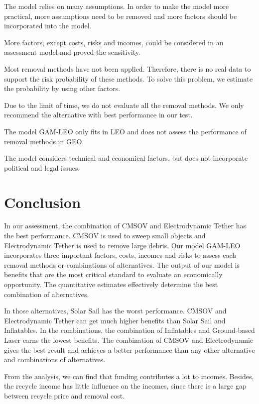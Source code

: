 \documentclass{mcmthesis}
\begin{document}
		The model relies on many assumptions. In order to make the model more practical, more assumptions need to be removed and more factors should be incorporated into the model.
		
		More factors, except costs, risks and incomes, could be considered in an assessment model and proved the sensitivity.
		
		Most removal methods have not been applied. Therefore, there is no real data to support the risk probability of these methods. To solve this problem, we estimate the probability by using other factors.
		
		Due to the limit of time, we do not evaluate all the removal methods. We only recommend the alternative with best performance in our test.
		
		The model GAM-LEO only fits in LEO and does not assess the performance of removal methods in GEO.
		
		The model considers technical and economical factors, but does not incorporate political and legal issues.


	
	
\section{Conclusion} \label{Sec-Conclusion}
	In our assessment, the combination of CMSOV and Electrodynamic Tether has the best performance. CMSOV is used to sweep small objects and Electrodynamic Tether is used to remove large debris. Our model GAM-LEO incorporates three important factors, costs, incomes and risks to assess each removal methods or combinations of alternatives. The output of our model is benefits that are the most critical standard to evaluate an economically opportunity. The quantitative estimates effectively determine the best combination of alternatives.
	
	In those alternatives, Solar Sail has the worst performance. CMSOV and Electrodynamic Tether can get much higher benefits than Solar Sail and Inflatables. In the combinations, the combination of Inflatables and Ground-based Laser earns the lowest benefits. The combination of CMSOV and Electrodynamic gives the best result and achieves a better performance than any other alternative and combinations of alternatives.
	
	From the analysis, we can find that funding contributes a lot to incomes. Besides, the recycle income has little influence on the incomes, since there is a large gap between recycle price and removal cost.
	
\end{document}
